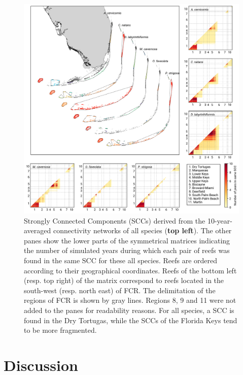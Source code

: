 \documentclass[preprint,12pt,authoryear]{elsarticle}
\begin{document}
	
	\begin{figure}
		\centering
		\includegraphics[width=.98\textwidth]{figures/comparison_sccs.png}
		\caption{Strongly Connected Components (SCCs) derived from the 10-year-averaged connectivity networks of all species (\textbf{top left}). The other panes show the lower parts of the symmetrical matrices indicating the number of simulated years during which each pair of reefs was found in the same SCC for these all species. Reefs are ordered according to their geographical coordinates. Reefs of the bottom left (resp. top right) of the matrix correspond to reefs located in the south-west (resp. north east) of FCR. The delimitation of the regions of FCR is shown by gray lines. Regions 8, 9 and 11 were not added to the panes for readability reasons. For all species, a SCC is found in the Dry Tortugas, while the SCCs of the Florida Keys tend to be more fragmented.}\label{fig:scc}
	\end{figure}
	
	
	\section*{Discussion}
	
\end{document}
